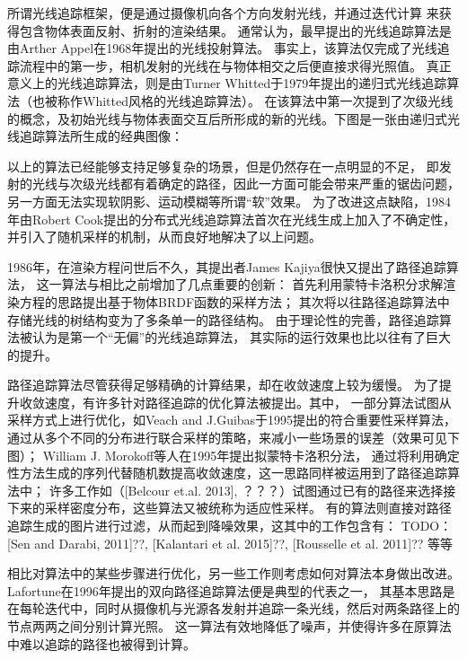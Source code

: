 所谓光线追踪框架，便是通过摄像机向各个方向发射光线，并通过迭代计算
来获得包含物体表面反射、折射的渲染结果。
通常认为，最早提出的光线追踪算法是由Arther Appel在1968年提出的光线投射算法\cite{RayCasting}。
事实上，该算法仅完成了光线追踪流程中的第一步，相机发射的光线在与物体相交之后便直接求得光照值。
真正意义上的光线追踪算法，则是由Turner Whitted于1979年提出的递归式光线追踪算法\cite{WhittedRayTracing}（也被称作Whitted风格的光线追踪算法）。
在该算法中第一次提到了次级光线的概念，及初始光线与物体表面交互后所形成的新的光线。下图是一张由递归式光线追踪算法所生成的经典图像：

以上的算法已经能够支持足够复杂的场景，但是仍然存在一点明显的不足，
即发射的光线与次级光线都有着确定的路径，因此一方面可能会带来严重的锯齿问题，
另一方面无法实现软阴影、运动模糊等所谓“软”效果。
为了改进这点缺陷，1984年由Robert Cook提出的分布式光线追踪算法\cite{DistributiveRayTracing}首次在光线生成上加入了不确定性，
并引入了随机采样的机制，从而良好地解决了以上问题。

1986年，在渲染方程问世后不久，其提出者James Kajiya很快又提出了路径追踪算法\cite{PathTracing}，
这一算法与相比之前增加了几点重要的创新：
首先利用蒙特卡洛积分求解渲染方程的思路提出基于物体BRDF函数的采样方法；
其次将以往路径追踪算法中存储光线的树结构变为了多条单一的路径结构。
由于理论性的完善，路径追踪算法被认为是第一个“无偏”的光线追踪算法，
其实际的运行效果也比以往有了巨大的提升。

路径追踪算法尽管获得足够精确的计算结果，却在收敛速度上较为缓慢。
为了提升收敛速度，有许多针对路径追踪的优化算法被提出。其中，
一部分算法试图从采样方式上进行优化，如Veach and J.Guibas于1995提出的符合重要性采样\cite{MultipleImportanceSampling}算法，
通过从多个不同的分布进行联合采样的策略，来减小一些场景的误差（效果可见下图）；
William J. Morokoff等人在1995年提出拟蒙特卡洛积分法\cite{QuasiMonteCarlo}，
通过将利用确定性方法生成的序列代替随机数提高收敛速度，这一思路同样被运用到了路径追踪算法中；
许多工作如（[Belcour et.al. 2013], ？？？）试图通过已有的路径来选择接下来的采样密度分布，这些算法又被统称为适应性采样。
有的算法则直接对路径追踪生成的图片进行过滤，从而起到降噪效果，这其中的工作包含有：
TODO：[Sen and Darabi, 2011]??, [Kalantari et al. 2015]??, [Rousselle et al. 2011]??
等等

相比对算法中的某些步骤进行优化，另一些工作则考虑如何对算法本身做出改进。
Lafortune在1996年提出的双向路径追踪算法\cite{BidirectionalPathTracing}便是典型的代表之一，
其基本思路是在每轮迭代中，同时从摄像机与光源各发射并追踪一条光线，然后对两条路径上的节点两两之间分别计算光照。
这一算法有效地降低了噪声，并使得许多在原算法中难以追踪的路径也被得到计算。


